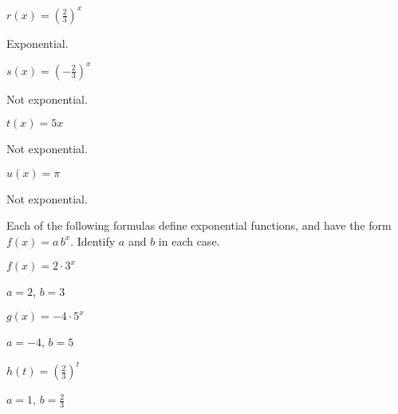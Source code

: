\begin{exercises}
\begin{problem}
\begin{multicols}{4}
\begin{subproblem}
	\end{subproblem}
	\begin{subproblem}
		$r(x)=\left(\frac{2}{3}\right)^x$
		\begin{shortsolution}
			Exponential.
		\end{shortsolution}
	\end{subproblem}
	\begin{subproblem}
		$s(x)=\left(-\frac{2}{3}\right)^x$
		\begin{shortsolution}
			Not exponential.
		\end{shortsolution}
	\end{subproblem}
	\begin{subproblem}
		$t(x)=5x$
		\begin{shortsolution}
			Not exponential.
		\end{shortsolution}
	\end{subproblem}
	\begin{subproblem}
		$u(x)=\pi$
		\begin{shortsolution}
			Not exponential.
		\end{shortsolution}
	\end{subproblem}
\end{multicols}
\end{problem}
\begin{problem}
Each of the following formulas define exponential functions, and have the form $f(x)=a\,b^x$. 
Identify $a$ and $b$ in each case.
\begin{multicols}{4}
	\begin{subproblem}
		$f(x)=2\cdot 3^x$
		\begin{shortsolution}
			$a=2$, $b=3$ 
		\end{shortsolution}
	\end{subproblem}
	\begin{subproblem}
		$g(x)=-4\cdot 5^x$
		\begin{shortsolution}
			$a=-4$, $b=5$ 
		\end{shortsolution}
	\end{subproblem}
	\begin{subproblem}
		$h(t) = \left( \frac{2}{3} \right)^t$
		\begin{shortsolution}
			$a=1$, $b=\frac{2}{3}$ 
		\end{shortsolution}
	\end{subproblem}
	\begin{subproblem}

\end{subproblem}
\end{multicols}
\end{problem}
\end{exercises}
